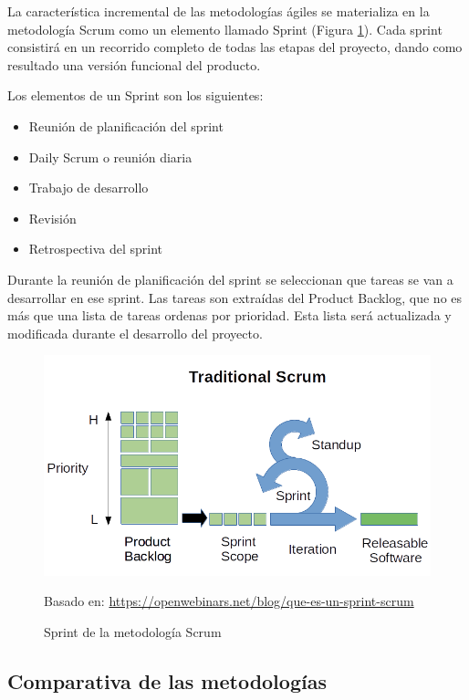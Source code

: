 La característica incremental de las metodologías ágiles se materializa en la metodología Scrum como un elemento llamado Sprint (Figura \ref{fig:sprint_scrum}). Cada sprint consistirá en un recorrido completo de todas las etapas del proyecto, dando como resultado una versión funcional del producto.

Los elementos de un Sprint son los siguientes:

\begin{itemize}
\item Reunión de planificación del sprint
\item Daily Scrum o reunión diaria
\item Trabajo de desarrollo
\item Revisión
\item Retrospectiva del sprint
\end{itemize}

Durante la reunión de planificación del sprint se seleccionan que tareas se van a desarrollar en ese sprint. Las tareas son extraídas del Product Backlog, que no es más que una lista de tareas ordenas por prioridad. Esta lista será actualizada y modificada durante el desarrollo del proyecto.

\begin{figure}[h]
\centering
\includegraphics[width=1.0\textwidth]{imagenes/03_Analisis/sprint_scrum.png}
\begin{center}
Basado en: \url{https://openwebinars.net/blog/que-es-un-sprint-scrum}
\end{center}
\caption{Sprint de la metodología Scrum}
\label{fig:sprint_scrum}
\end{figure}


\subsection{Comparativa de las metodologías}

